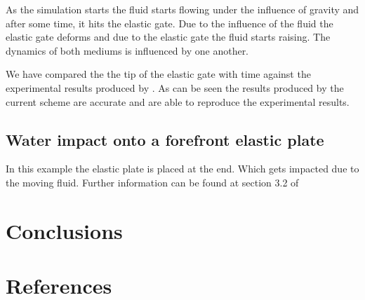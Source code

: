 \documentclass[preprint,12pt]{elsarticle}
\begin{document}
As the simulation starts the fluid starts flowing under the influence of
gravity and after some time, it hits the elastic gate. Due to the influence of
the fluid the elastic gate deforms and due to the elastic gate the fluid
starts raising. The dynamics of both mediums is influenced by one another.


We have compared the the tip of the elastic gate with time against the
experimental results produced by \cite{xxx}. As can be seen the results
produced by the current scheme are accurate and are able to reproduce the
experimental results.





\subsection{Water impact onto a forefront elastic plate}
\label{sec:water-impact-forefront}

In this example the elastic plate is placed at the end. Which gets
impacted due to the moving fluid. Further information can be found at
section 3.2 of \cite{liu2013numerical}






\section{Conclusions}
\label{sec:conclusions}


\section*{References}


\end{document}
